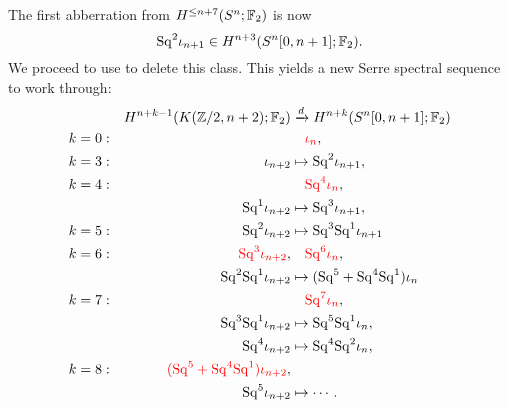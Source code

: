 The first abberration from $H^{\le n+7}(S^n; \mathbb F_2)$ is now \[\mathrm{Sq}^2 \iota_{n+1} \in H^{n+3}(S^n[0, n+1]; \mathbb F_2).\]
We proceed to use  to delete this class.
This yields a new Serre spectral sequence to work through:
\begin{align*}
& & H^{n+k-1}(K(\mathbb Z/2, n+2); \mathbb F_2) & \xrightarrow{d} H^{n+k}(S^n[0, n+1]; \mathbb F_2) \\
k & = 0: & & \quad \textcolor{red}{\iota_n}, \\
k & = 3: & \iota_{n+2} & \mapsto \mathrm{Sq}^2 \iota_{n+1}, \\
k & = 4: & & \quad \textcolor{red}{\mathrm{Sq}^4 \iota_n}, \\
& & \mathrm{Sq}^1 \iota_{n+2} & \mapsto \mathrm{Sq}^3 \iota_{n+1}, \\
k & = 5: & \mathrm{Sq}^2 \iota_{n+2} & \mapsto \mathrm{Sq}^3 \mathrm{Sq}^1 \iota_{n+1} \\
k & = 6: & \textcolor{red}{\mathrm{Sq}^3 \iota_{n+2}}, & \quad \textcolor{red}{\mathrm{Sq}^6 \iota_n}, \\
& & \mathrm{Sq}^2 \mathrm{Sq}^1 \iota_{n+2} & \mapsto (\mathrm{Sq}^5 + \mathrm{Sq}^4\mathrm{Sq}^1) \iota_n \\
k & = 7: & & \quad \textcolor{red}{\mathrm{Sq}^7 \iota_n}, \\
& & \mathrm{Sq}^3 \mathrm{Sq}^1 \iota_{n+2} & \mapsto \mathrm{Sq}^5 \mathrm{Sq}^1 \iota_n, \\
& & \mathrm{Sq}^4 \iota_{n+2} & \mapsto \mathrm{Sq}^4 \mathrm{Sq}^2 \iota_n, \\
k & = 8: & \textcolor{red}{(\mathrm{Sq}^5 + \mathrm{Sq}^4 \mathrm{Sq}^1) \iota_{n+2}}, \\
& & \mathrm{Sq}^5 \iota_{n+2} & \mapsto \cdots.
\end{align*}


